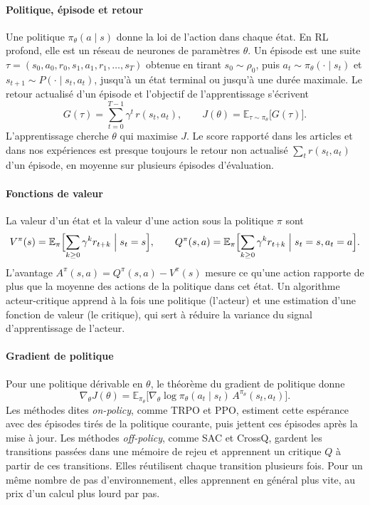 \paragraph{Politique, épisode et retour}
Une politique $\pi_\theta(a \mid s)$ donne la loi de l'action dans chaque état. En RL profond, elle
est un réseau de neurones de paramètres $\theta$. Un épisode est une suite
$\tau = (s_0, a_0, r_0, s_1, a_1, r_1, \dots, s_T)$ obtenue en tirant $s_0 \sim \rho_0$, puis
$a_t \sim \pi_\theta(\cdot \mid s_t)$ et $s_{t+1} \sim P(\cdot \mid s_t, a_t)$, jusqu'à un état
terminal ou jusqu'à une durée maximale. Le retour actualisé d'un épisode et l'objectif de
l'apprentissage s'écrivent
\begin{equation}
  G(\tau) = \sum_{t=0}^{T-1} \gamma^t \, r(s_t, a_t),
  \qquad
  J(\theta) = \mathbb{E}_{\tau \sim \pi_\theta}\bigl[ G(\tau) \bigr].
\end{equation}
L'apprentissage cherche $\theta$ qui maximise $J$. Le score rapporté dans les articles et dans nos
expériences est presque toujours le retour non actualisé $\sum_t r(s_t, a_t)$ d'un épisode, en moyenne
sur plusieurs épisodes d'évaluation.

\paragraph{Fonctions de valeur}
La valeur d'un état et la valeur d'une action sous la politique $\pi$ sont
\begin{equation}
  V^\pi(s) = \mathbb{E}_\pi\Bigl[ \sum_{k \geq 0} \gamma^k r_{t+k} \Bigm| s_t = s \Bigr],
  \qquad
  Q^\pi(s, a) = \mathbb{E}_\pi\Bigl[ \sum_{k \geq 0} \gamma^k r_{t+k} \Bigm| s_t = s, a_t = a \Bigr].
\end{equation}
L'avantage $A^\pi(s, a) = Q^\pi(s, a) - V^\pi(s)$ mesure ce qu'une action rapporte de plus que la
moyenne des actions de la politique dans cet état. Un algorithme acteur-critique apprend à la fois
une politique (l'acteur) et une estimation d'une fonction de valeur (le critique), qui sert à réduire
la variance du signal d'apprentissage de l'acteur.

\paragraph{Gradient de politique}
Pour une politique dérivable en $\theta$, le théorème du gradient de politique \parencite{sutton2018rl}
donne
\begin{equation}
  \nabla_\theta J(\theta) = \mathbb{E}_{\pi_\theta}\bigl[ \nabla_\theta \log \pi_\theta(a_t \mid s_t)\, A^{\pi_\theta}(s_t, a_t) \bigr].
\end{equation}
Les méthodes dites \emph{on-policy}, comme TRPO et PPO, estiment cette espérance avec des épisodes
tirés de la politique courante, puis jettent ces épisodes après la mise à jour. Les méthodes
\emph{off-policy}, comme SAC et CrossQ, gardent les transitions passées dans une mémoire de rejeu et
apprennent un critique $Q$ à partir de ces transitions. Elles réutilisent chaque transition plusieurs
fois. Pour un même nombre de pas d'environnement, elles apprennent en général plus vite, au prix d'un
calcul plus lourd par pas.

